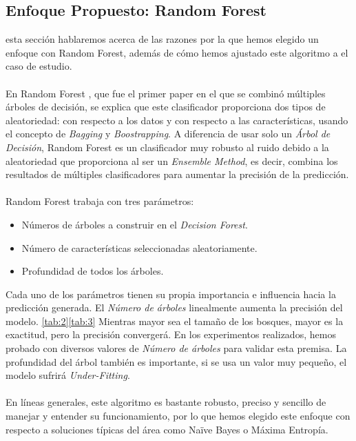 \documentclass{sciposter}
\begin{document}
\begin{multicols}{3}
\section{Enfoque Propuesto: Random Forest}
 esta secci\'on hablaremos acerca de las razones por la que hemos elegido un enfoque con Random Forest, adem\'as de c\'omo hemos ajustado este algoritmo a el caso de estudio.
\\\\
En Random Forest \cite{Breiman:2001}, que fue el primer paper en el que se combin\'o m\'ultiples \'arboles de decisi\'on, se explica que este clasificador proporciona dos tipos de aleatoriedad: con respecto a los datos y con respecto a las caracter\'isticas, usando el concepto de \emph{Bagging} y \emph{Boostrapping}. A diferencia de usar solo un \emph{\'Arbol de Decisi\'on}, Random Forest es un clasificador muy robusto al ruido debido a la aleatoriedad que proporciona \cite{Parmar:Bhanderi:Shah:2014} al ser un \emph{Ensemble Method}, es decir, combina los resultados de m\'ultiples clasificadores para aumentar la precisi\'on de la predicci\'on.
\\\\
Random Forest trabaja con tres par\'ametros:
\begin{itemize}
\item N\'umeros de \'arboles a construir en el \emph{Decision Forest}.
\item N\'umero de caracter\'isticas seleccionadas aleatoriamente.
\item Profundidad de todos los \'arboles.
\end{itemize}

Cada uno de los par\'ametros tienen su propia importancia  e influencia hacia la predicci\'on generada. El \emph{N\'umero de \'arboles} linealmente aumenta la precisi\'on del modelo. \ref{tab:2}\ref{tab:3} Mientras mayor sea el tamaño de los bosques, mayor es la exactitud, pero la precisi\'on converger\'a. En los experimentos realizados, hemos probado con diversos valores de \emph{N\'umero de \'arboles} para validar esta premisa. La profundidad del \'arbol tambi\'en es importante, si se usa un valor muy pequeño, el modelo sufrir\'a \emph{Under-Fitting}. 
\\\\
En l\'ineas generales, este algoritmo es bastante robusto, preciso y sencillo de manejar y entender su funcionamiento, por lo que hemos elegido este enfoque con respecto a soluciones t\'ipicas del \'area como Na\"ive Bayes o M\'axima Entrop\'ia. 


\end{multicols}
\end{document}
